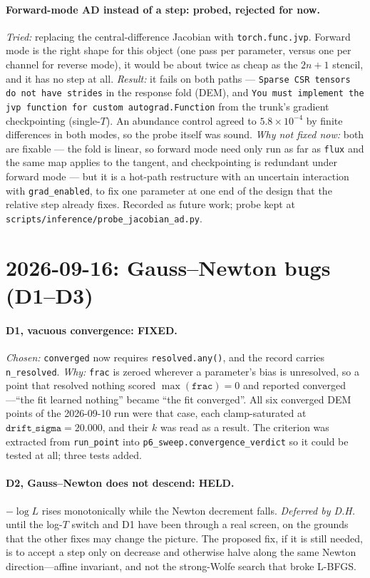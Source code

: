 \documentclass[11pt]{article}
\begin{document}
\paragraph{Forward-mode AD instead of a step: probed, rejected for now.}
\emph{Tried:} replacing the central-difference Jacobian with
\texttt{torch.func.jvp}. Forward mode is the right shape for this object (one
pass per parameter, versus one per channel for reverse mode), it would be about
twice as cheap as the $2n+1$ stencil, and it has no step at all.
\emph{Result:} it fails on both paths --- \texttt{Sparse CSR tensors do not have
strides} in the response fold (DEM), and \texttt{You must implement the jvp
function for custom autograd.Function} from the trunk's gradient checkpointing
(single-$T$). An abundance control agreed to $5.8\times10^{-4}$ by finite
differences in both modes, so the probe itself was sound.
\emph{Why not fixed now:} both are fixable --- the fold is linear, so forward
mode need only run as far as \texttt{flux} and the same map applies to the
tangent, and checkpointing is redundant under forward mode --- but it is a
hot-path restructure with an uncertain interaction with \texttt{grad\_enabled},
to fix one parameter at one end of the design that the relative step already
fixes. Recorded as future work; probe kept at
\texttt{scripts/inference/probe\_jacobian\_ad.py}.

\section*{2026-09-16: Gauss--Newton bugs (D1--D3)}

\paragraph{D1, vacuous convergence: FIXED.} \emph{Chosen:} \texttt{converged}
now requires \texttt{resolved.any()}, and the record carries
\texttt{n\_resolved}. \emph{Why:} \texttt{frac} is zeroed wherever a
parameter's bias is unresolved, so a point that resolved nothing scored
$\max(\texttt{frac})=0$ and reported converged---``the fit learned nothing''
became ``the fit converged''. All six converged DEM points of the 2026-09-10
run were that case, each clamp-saturated at $\texttt{drift\_sigma}=20.000$, and
their $k$ was read as a result. The criterion was extracted from
\texttt{run\_point} into \texttt{p6\_sweep.convergence\_verdict} so it could be
tested at all; three tests added.

\paragraph{D2, Gauss--Newton does not descend: HELD.} $-\log L$ rises
monotonically while the Newton decrement falls. \emph{Deferred by D.H.} until
the log-$T$ switch and D1 have been through a real screen, on the grounds that
the other fixes may change the picture. The proposed fix, if it is still needed,
is to accept a step only on decrease and otherwise halve along the same Newton
direction---affine invariant, and not the strong-Wolfe search that broke
L-BFGS.
\end{document}
